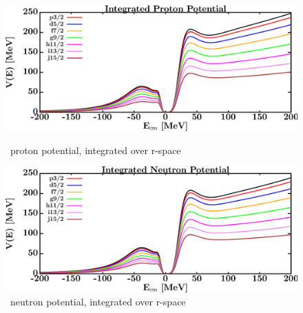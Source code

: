 \begin{figure}[H]
    \centering
    \begin{minipage}{0.45\textwidth}
        \centering
        \includegraphics[width=1.0\textwidth]{figures/o18_protonVolumeIntegrals.png}
        \caption{\oEight\ proton potential, integrated over r-space}
        \label{DOMFitData_o18_proton_potentialIntegral}
    \end{minipage}\hfill
    \begin{minipage}{0.45\textwidth}
        \centering
        \includegraphics[width=1.0\textwidth]{figures/o18_neutronVolumeIntegrals.png}
        \caption{\oEight\ neutron potential, integrated over r-space}
        \label{DOMFitData_o18_neutron_potentialIntegral}
    \end{minipage}
\end{figure}

\afterpage{\clearpage}

